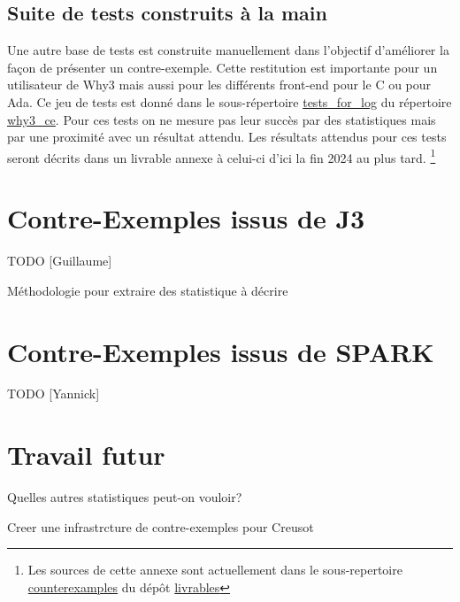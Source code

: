\documentclass[a4paper,11pt]{article}
\begin{document}
\subsection{Suite de tests construits à la main}

Une autre base de tests est construite manuellement dans l'objectif d'améliorer
la façon de présenter un contre-exemple. Cette restitution est importante pour
un utilisateur de Why3 mais aussi pour les différents front-end pour le C ou
pour Ada. Ce jeu de tests est donné dans le sous-répertoire \url{tests_for_log}
du répertoire \url{why3_ce}. Pour ces tests on ne mesure pas leur succès par des
statistiques mais par une proximité avec un résultat attendu. Les résultats
attendus pour ces tests seront décrits dans un livrable annexe à celui-ci d'ici
la fin 2024 au plus tard.  \footnote{Les sources de cette annexe sont
  actuellement dans le sous-repertoire \url{counterexamples} du dépôt
  \url{livrables}}

\section{Contre-Exemples issus de J3}

TODO [Guillaume]

Méthodologie pour extraire des statistique à décrire

\section{Contre-Exemples issus de SPARK}

TODO [Yannick]


\section{Travail futur}

Quelles autres statistiques peut-on vouloir?

Creer une infrastrcture de contre-exemples pour Creusot

\clearpage



%
\end{document}
